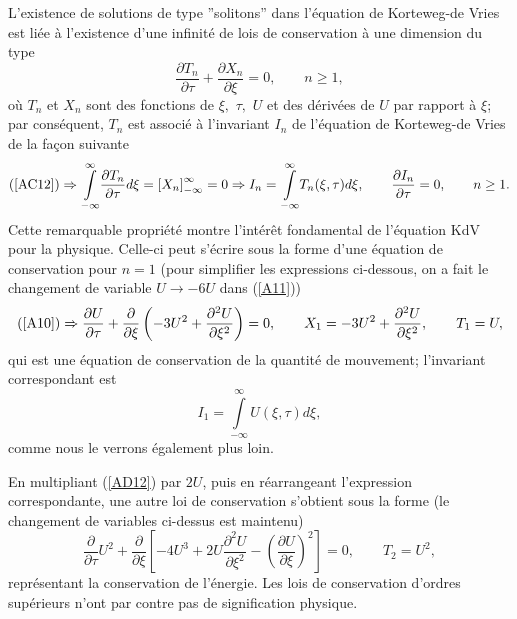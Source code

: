 \documentclass[10pt,thmsa]{article}
\begin{document}
L'existence de solutions de type ''solitons'' dans l'\'{e}quation de
Korteweg-de Vries est li\'{e}e \`{a} l'existence d'une infinit\'{e} de lois de
conservation \`{a} une dimension du type
\begin{equation}
\frac{\partial T_{n}}{\partial\tau}+\frac{\partial X_{n}}{\partial\xi
}=0,\qquad n\geq1,\label{AC12}%
\end{equation}
o\`{u} $T_{n}$ et $X_{n}$ sont des fonctions de $\xi,$ $\tau,$ $U$ et des
d\'{e}riv\'{e}es de $U$ par rapport \`{a} $\xi$; par cons\'{e}quent, $T_{n}$
est associ\'{e} \`{a} l'invariant $I_{n}$ de l'\'{e}quation de Korteweg-de
Vries de la fa\c{c}on suivante
\begin{equation}
(\text{\ref{AC12}})\Rightarrow\underset{-\infty}{\overset{\infty}{\int}}%
\frac{\partial T_{n}}{\partial\tau}d\xi=\left[  X_{n}\right]  _{-\infty
}^{\infty}=0\Rightarrow I_{n}=\underset{-\infty}{\overset{\infty}{\int}}%
T_{n}(\xi,\tau)d\xi,\qquad\frac{\partial I_{n}}{\partial\tau}=0,\qquad
n\geq1.\label{ACC12}%
\end{equation}
Cette remarquable propri\'{e}t\'{e} montre l'int\'{e}r\^{e}t fondamental de
l'\'{e}quation KdV pour la physique. Celle-ci peut s'\'{e}crire sous la forme
d'une \'{e}quation de conservation pour $n=1$ (pour simplifier les expressions
ci-dessous, on a fait le changement de variable $U\rightarrow-6U $ dans
(\ref{A11}))
\begin{equation}
\text{(\ref{A10})}\Rightarrow\frac{\partial U}{\partial\tau}+\frac{\partial
}{\partial\xi}\left(  -3U^{2}+\frac{\partial^{2}U}{\partial\xi^{2}}\right)
=0,\qquad X_{1}=-3U^{2}+\frac{\partial^{2}U}{\partial\xi^{2}},\qquad
T_{1}=U,\label{AD12}%
\end{equation}
qui est une \'{e}quation de conservation de la quantit\'{e} de mouvement;
l'invariant correspondant est
\begin{equation}
I_{1}=\underset{-\infty}{\overset{\infty}{\int}}U(\xi,\tau)d\xi,\label{ADD12}%
\end{equation}
comme nous le verrons \'{e}galement plus loin.

En multipliant (\ref{AD12}) par $2U$, puis en r\'{e}arrangeant l'expression
correspondante, une autre loi de conservation s'obtient sous la forme (le
changement de variables ci-dessus est maintenu)
\begin{equation}
\frac{\partial}{\partial\tau}U^{2}+\frac{\partial}{\partial\xi}\left[
-4U^{3}+2U\frac{\partial^{2}U}{\partial\xi^{2}}-\left(  \frac{\partial
U}{\partial\xi}\right)  ^{2}\right]  =0,\qquad T_{2}=U^{2},\label{AE12}%
\end{equation}
repr\'{e}sentant la conservation de l'\'{e}nergie. Les lois de conservation
d'ordres sup\'{e}rieurs n'ont par contre pas de signification physique.
\end{document}
